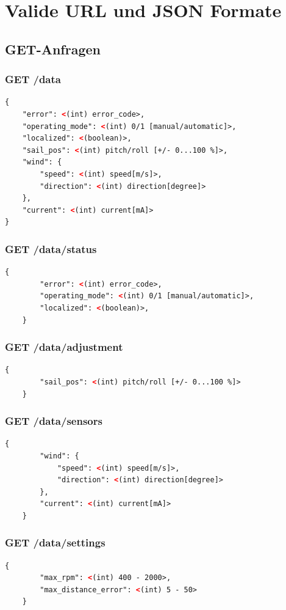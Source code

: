 \section{Valide URL und JSON Formate}
\label{sec:REST}
\subsection{GET-Anfragen}
\subsubsection{GET /data}
\begin{lstlisting}[language=XML, caption={GET-Request 1}]
{
	"error": <(int) error_code>,
	"operating_mode": <(int) 0/1 [manual/automatic]>,
	"localized": <(boolean)>,
	"sail_pos": <(int) pitch/roll [+/- 0...100 %]>,
	"wind": {
		"speed": <(int) speed[m/s]>,
		"direction": <(int) direction[degree]>
	},
	"current": <(int) current[mA]>
}
\end{lstlisting}
\subsubsection{GET /data/status}
\begin{lstlisting}[language=XML, caption={GET-Request 2}]
	{
		"error": <(int) error_code>,
		"operating_mode": <(int) 0/1 [manual/automatic]>,
		"localized": <(boolean)>,
	}
\end{lstlisting}
\subsubsection{GET /data/adjustment}
\begin{lstlisting}[language=XML, caption={GET-Request 3}]
	{
		"sail_pos": <(int) pitch/roll [+/- 0...100 %]>
	}
\end{lstlisting}
\newpage
\subsubsection{GET /data/sensors}
\begin{lstlisting}[language=XML, caption={GET-Request 4}]
	{
		"wind": {
			"speed": <(int) speed[m/s]>,
			"direction": <(int) direction[degree]>
		},
		"current": <(int) current[mA]>
	}
\end{lstlisting}
\subsubsection{GET /data/settings}
\begin{lstlisting}[language=XML, caption={GET-Request 5}]
	{
		"max_rpm": <(int) 400 - 2000>,
		"max_distance_error": <(int) 5 - 50>
	}
\end{lstlisting}

